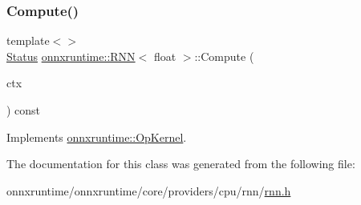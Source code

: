 \subsubsection{\texorpdfstring{Compute()}{Compute()}\hspace{0.1cm}{\footnotesize\ttfamily [2/2]}}
{\footnotesize\ttfamily template$<$$>$ \\
\mbox{\hyperlink{classonnxruntime_1_1common_1_1Status}{Status}} \mbox{\hyperlink{classonnxruntime_1_1RNN}{onnxruntime\+::\+R\+NN}}$<$ float $>$\+::Compute (\begin{DoxyParamCaption}\item[{\mbox{\hyperlink{classonnxruntime_1_1OpKernelContext}{Op\+Kernel\+Context}} $\ast$}]{ctx }\end{DoxyParamCaption}) const\hspace{0.3cm}{\ttfamily [virtual]}}



Implements \mbox{\hyperlink{classonnxruntime_1_1OpKernel_a9eca8656a78b1b3ab9d3351a12798650}{onnxruntime\+::\+Op\+Kernel}}.



The documentation for this class was generated from the following file\+:\begin{DoxyCompactItemize}
\item 
onnxruntime/onnxruntime/core/providers/cpu/rnn/\mbox{\hyperlink{cpu_2rnn_2rnn_8h}{rnn.\+h}}\end{DoxyCompactItemize}
